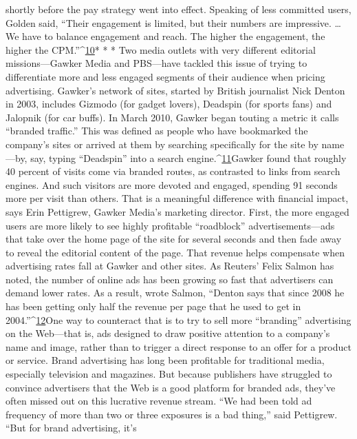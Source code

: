 shortly before the pay strategy went into effect. Speaking of less committed
users, Golden said, ``Their engagement is limited, but their numbers are impressive.
… We have to balance engagement and reach. The higher the engagement,
the higher the CPM.''^{\href{#endnotes-chapter-2}{10}}* * *
Two media outlets with very different editorial missions—Gawker Media and
PBS—have tackled this issue of trying to differentiate more and less engaged segments
of their audience when pricing advertising.
Gawker's network of sites, started by British journalist Nick Denton in 2003,
includes Gizmodo (for gadget lovers), Deadspin (for sports fans) and Jalopnik
(for car buffs). In March 2010, Gawker began touting a metric it calls ``branded
traffic.'' This was defined as people who have bookmarked the company's sites
or arrived at them by searching specifically for the site by name—by, say, typing
``Deadspin'' into a search engine.^{\href{#endnotes-chapter-2}{11}}Gawker found that roughly 40 percent of visits come via branded routes, as
contrasted to links from search engines. And such visitors are more devoted
and engaged, spending 91 seconds more per visit than others. That is a meaningful
difference with financial impact, says Erin Pettigrew, Gawker Media's
marketing director.
First, the more engaged users are more likely to see highly profitable ``roadblock''
advertisements—ads that take over the home page of the site for several
seconds and then fade away to reveal the editorial content of the page. That revenue
helps compensate when advertising rates fall at Gawker and other sites. As
Reuters' Felix Salmon has noted, the number of online ads has been growing so
fast that advertisers can demand lower rates. As a result, wrote Salmon, ``Denton
says that since 2008 he has been getting only half the revenue per page that he
used to get in 2004.''^{\href{#endnotes-chapter-2}{12}}One way to counteract that is to try to sell more ``branding'' advertising on the
Web—that is, ads designed to draw positive attention to a company's name and
image, rather than to trigger a direct response to an offer for a product or service.
Brand advertising has long been profitable for traditional media, especially television
and magazines. But because publishers have struggled to convince advertisers
that the Web is a good platform for branded ads, they've often missed out on
this lucrative revenue stream. ``We had been told ad frequency of more than two
or three exposures is a bad thing,'' said Pettigrew. ``But for brand advertising, it's
